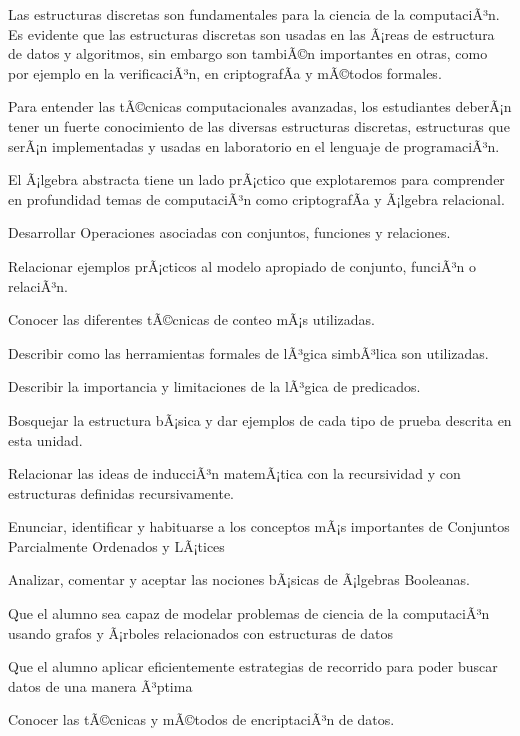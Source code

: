 \begin{syllabus}


\begin{justification}
Las estructuras discretas son fundamentales para la ciencia de la computaciÃ³n. Es evidente que las estructuras discretas son usadas en las Ã¡reas de estructura de datos y algoritmos, sin embargo son tambiÃ©n importantes en otras, como por ejemplo en la verificaciÃ³n, en criptografÃ­a y mÃ©todos formales.

Para entender las tÃ©cnicas computacionales avanzadas, los estudiantes deberÃ¡n tener un fuerte conocimiento de las diversas estructuras discretas, estructuras que serÃ¡n implementadas y usadas en laboratorio en el lenguaje de programaciÃ³n.

El Ã¡lgebra abstracta tiene un lado prÃ¡ctico que explotaremos para comprender en profundidad temas de computaciÃ³n como criptografÃ­a y Ã¡lgebra relacional.
\end{justification}

\begin{goals}
\item Desarrollar Operaciones asociadas con conjuntos, funciones y relaciones.
\item Relacionar ejemplos prÃ¡cticos al modelo apropiado de conjunto, funciÃ³n o relaciÃ³n.
\item Conocer las diferentes tÃ©cnicas de conteo mÃ¡s utilizadas.
\item Describir como las herramientas formales de lÃ³gica simbÃ³lica son utilizadas.
\item Describir la importancia y limitaciones de la lÃ³gica de predicados.
\item Bosquejar la estructura bÃ¡sica y dar ejemplos de cada tipo de prueba descrita en esta unidad.
\item Relacionar las ideas de inducciÃ³n matemÃ¡tica con la recursividad y con estructuras definidas recursivamente.
\item Enunciar, identificar y habituarse a los conceptos mÃ¡s importantes de Conjuntos Parcialmente Ordenados y LÃ¡tices
\item Analizar, comentar y aceptar las nociones bÃ¡sicas de Ã¡lgebras Booleanas.
\item Que el alumno sea capaz de modelar problemas de ciencia de la computaciÃ³n usando grafos y Ã¡rboles relacionados con estructuras de datos
\item Que el alumno aplicar eficientemente estrategias de recorrido para poder buscar datos de una manera Ã³ptima
\item Conocer las tÃ©cnicas y mÃ©todos de encriptaciÃ³n de datos.
\end{goals}


\end{syllabus}
